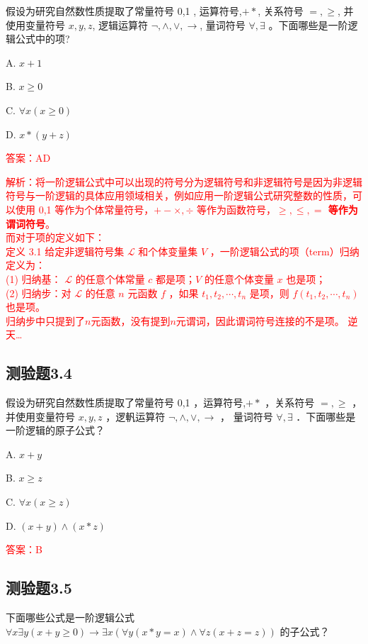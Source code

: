 \documentclass[UTF8, heading=true]{ctexart}
\begin{document}
假设为研究自然数性质提取了常量符号 0,1 , 运算符号,$+ *$,
 关系符号 $=, \geq$, 并使用变量符号 $x, y, z$, 
 逻辑运算符 $\neg, \wedge, \vee, \rightarrow$, 量词符号 $\forall, \exists$ 。下面哪些是一阶逻辑公式中的项?

A. $ x+1$

B. $ x \geq 0$

C. $\forall x(x \geq 0)$

D. $ x *(y+z)$

\textcolor{red}{答案：AD}

\textcolor{red}{解析：将一阶逻辑公式中可以出现的符号分为逻辑符号和非逻辑符号是因为非逻辑符号与一阶逻辑的具体应用领域相关，例如应用一阶逻辑公式研究整数的性质，可以使用 0,1 等作为个体常量符号，$+- \times, \div$ 等作为函数符号，\textbf{$\geq, \leq,=$ 等作为谓词符号}。\\ 而对于项的定义如下：\\ \indent 定义 3.1 给定非逻辑符号集 $\mathcal{L}$ 和个体变量集 $V$ ，一阶逻辑公式的项（term）归纳定义为：
\\ \indent (1) 归纳基： $\mathcal{L}$ 的任意个体常量 $c$ 都是项；$V$ 的任意个体变量 $x$ 也是项；
\\ \indent (2) 归纳步：对 $\mathcal{L}$ 的任意 $n$ 元函数 $f$ ，如果 $t_1, t_2, \cdots, t_n$ 是项，则 $f\left(t_1, t_2, \cdots, t_n\right)$ 也是项。
\\ \indent 归纳步中只提到了$n$元函数，没有提到$n$元谓词，因此谓词符号连接的不是项。 逆天\dots}

\subsection{测验题3.4}

假设为研究自然数性质提取了常量符号 0,1 ，运算符号,$+ *$ ，关系符号 $=, \geq$ ，
并使用变量符号 $x, y, z$ ，逻軓运算符 $\neg, \wedge, \vee, \rightarrow$ ，
量词符号 $\forall, \exists$ ．下面哪些是一阶逻辑的原子公式？

A. $ x+y$

B. $ x \geq z$

C. $\forall x(x \geq z)$

D. $(x+y) \wedge(x * z)$

\textcolor{red}{答案：B}

\subsection{测验题3.5}

下面哪些公式是一阶逻辑公式 $\forall x \exists y(x+y \geq 0) \rightarrow \exists x(\forall y(x * y=x) \wedge \forall z(x+z=z))$ 的子公式？
\end{document}
